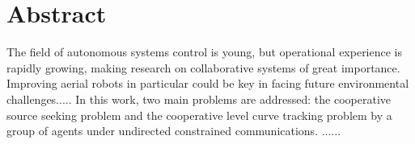 \chapter*{Abstract} \label{abstract}

The field of autonomous systems control is young, but operational experience is rapidly growing, making research on collaborative systems of great importance. Improving aerial robots in particular could be key in facing future environmental challenges.....
In this work, two main problems are addressed: the cooperative source seeking problem and the cooperative level curve tracking problem by a group of agents under undirected constrained communications. ......

